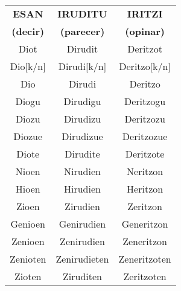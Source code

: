 \documentclass[11pt, a4paper]{article}
\begin{document}
\begin{table}[h]
	\centering
	\begin{tabular}{|c|c|c|}
		\hline
		\textbf{ESAN}    & \textbf{IRUDITU}   & \textbf{IRITZI}   \\
		\textbf{(decir)} & \textbf{(parecer)} & \textbf{(opinar)} \\ \hline\hline
		Diot             & Dirudit            & Deritzot          \\ \hline
		Dio[k/n]         & Dirudi[k/n]        & Deritzo[k/n]      \\ \hline
		Dio              & Dirudi             & Deritzo           \\ \hline
		Diogu            & Dirudigu           & Deritzogu         \\ \hline
		Diozu            & Dirudizu           & Deritzozu         \\ \hline
		Diozue           & Dirudizue          & Deritzozue        \\ \hline
		Diote            & Dirudite           & Deritzote         \\ \hline\hline
		Nioen            & Nirudien           & Neritzon          \\ \hline
		Hioen            & Hirudien           & Heritzon          \\ \hline
		Zioen            & Zirudien           & Zeritzon          \\ \hline
		Genioen          & Genirudien         & Generitzon        \\ \hline
		Zenioen          & Zenirudien         & Zeneritzon        \\ \hline
		Zenioten         & Zenirudieten       & Zeneritzoten      \\ \hline
		Zioten           & Ziruditen          & Zeritzoten        \\ \hline
	\end{tabular}
\end{table}
\end{document}
